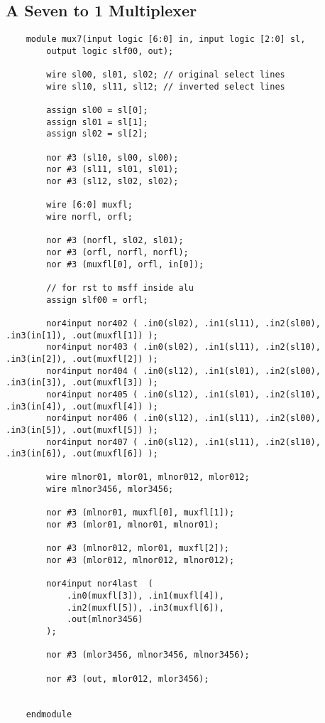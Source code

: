 \documentclass[../main]{subfiles}
\begin{document}
\subsection {A Seven to 1 Multiplexer}
\begin{verbatim}
    module mux7(input logic [6:0] in, input logic [2:0] sl,
        output logic slf00, out);

        wire sl00, sl01, sl02; // original select lines
        wire sl10, sl11, sl12; // inverted select lines

        assign sl00 = sl[0];
        assign sl01 = sl[1];
        assign sl02 = sl[2];

        nor #3 (sl10, sl00, sl00);
        nor #3 (sl11, sl01, sl01);
        nor #3 (sl12, sl02, sl02);

        wire [6:0] muxfl;
        wire norfl, orfl;

        nor #3 (norfl, sl02, sl01);
        nor #3 (orfl, norfl, norfl);
        nor #3 (muxfl[0], orfl, in[0]);

        // for rst to msff inside alu
        assign slf00 = orfl;

        nor4input nor402 ( .in0(sl02), .in1(sl11), .in2(sl00), .in3(in[1]), .out(muxfl[1]) );
        nor4input nor403 ( .in0(sl02), .in1(sl11), .in2(sl10), .in3(in[2]), .out(muxfl[2]) );
        nor4input nor404 ( .in0(sl12), .in1(sl01), .in2(sl00), .in3(in[3]), .out(muxfl[3]) );
        nor4input nor405 ( .in0(sl12), .in1(sl01), .in2(sl10), .in3(in[4]), .out(muxfl[4]) );
        nor4input nor406 ( .in0(sl12), .in1(sl11), .in2(sl00), .in3(in[5]), .out(muxfl[5]) );
        nor4input nor407 ( .in0(sl12), .in1(sl11), .in2(sl10), .in3(in[6]), .out(muxfl[6]) );

        wire mlnor01, mlor01, mlnor012, mlor012;
        wire mlnor3456, mlor3456;

        nor #3 (mlnor01, muxfl[0], muxfl[1]);
        nor #3 (mlor01, mlnor01, mlnor01);

        nor #3 (mlnor012, mlor01, muxfl[2]);
        nor #3 (mlor012, mlnor012, mlnor012);

        nor4input nor4last  (
            .in0(muxfl[3]), .in1(muxfl[4]),
            .in2(muxfl[5]), .in3(muxfl[6]),
            .out(mlnor3456)
        );

        nor #3 (mlor3456, mlnor3456, mlnor3456);

        nor #3 (out, mlor012, mlor3456);


    endmodule
\end{verbatim}
\end{document}
